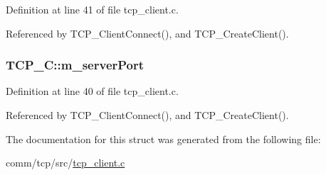 Definition at line 41 of file tcp\+\_\+client.\+c.



Referenced by T\+C\+P\+\_\+\+Client\+Connect(), and T\+C\+P\+\_\+\+Create\+Client().

\subsubsection[{\texorpdfstring{m\+\_\+server\+Port}{m_serverPort}}]{ T\+C\+P\+\_\+\+C\+::m\+\_\+server\+Port}\hypertarget{structTCP__C_ae5dea2bd422b4cefb22b5ce2ab082b4d}{}\label{structTCP__C_ae5dea2bd422b4cefb22b5ce2ab082b4d}


Definition at line 40 of file tcp\+\_\+client.\+c.



Referenced by T\+C\+P\+\_\+\+Client\+Connect(), and T\+C\+P\+\_\+\+Create\+Client().



The documentation for this struct was generated from the following file\+:\begin{DoxyCompactItemize}
\item 
comm/tcp/src/\hyperlink{tcp__client_8c}{tcp\+\_\+client.\+c}\end{DoxyCompactItemize}
